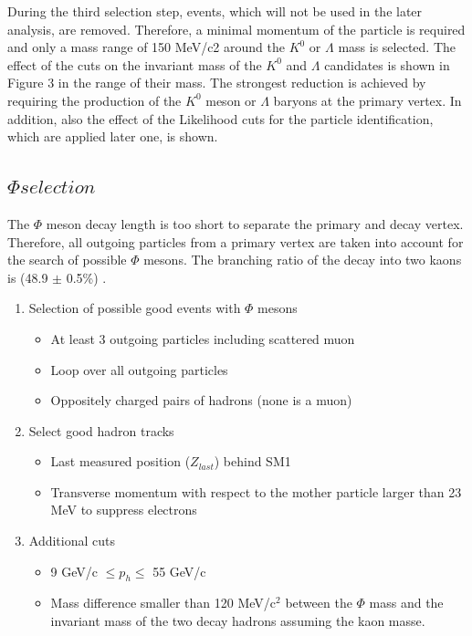 During the third selection step, events, which will not be used in the later analysis, are removed. Therefore, a minimal momentum of the particle is required and only a mass range of 150 MeV/c2 around the $K^0$ or $\Lambda$ mass is selected. The effect of the cuts on the invariant mass of the $K^0$ and $\Lambda$ candidates is shown in Figure 3 in the range of their mass. The strongest reduction is achieved by requiring the production of the $K^0$ meson or $\Lambda$ baryons at the primary vertex.
In addition, also the effect of the Likelihood cuts for the particle identification, which are applied later one, is shown.

\subsection{$\Phi selection$}

The $\Phi$ meson decay length is too short to separate the primary and decay vertex. Therefore, all outgoing particles from a primary vertex are taken into account for the search of possible $\Phi$ mesons. The branching ratio of the decay into two kaons is (48.9 $\pm$ 0.5\%) \cite{}.

\begin{enumerate}
  \item Selection of possible good events with $\Phi$ mesons
  \begin{itemize}
    \item At least 3 outgoing particles including scattered muon
    \item Loop over all outgoing particles
    \item Oppositely charged pairs of hadrons (none is a muon)
  \end{itemize}
  \item Select good hadron tracks
  \begin{itemize}
    \item Last measured position ($Z_{last}$) behind SM1
    \item Transverse momentum with respect to the mother particle larger than 23 MeV to suppress electrons
  \end{itemize}
  \item Additional cuts
  \begin{itemize}
    \item 9 GeV/c $\leq p_h \leq$ 55 GeV/c
    \item Mass difference smaller than 120 MeV/c$^2$ between the $\Phi$ mass and the invariant mass of the two decay hadrons assuming the kaon masse.
  \end{itemize}
\end{enumerate}

